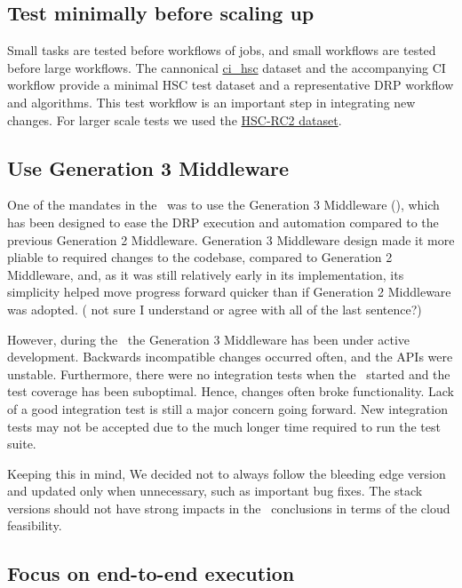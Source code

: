 \subsection{Test minimally before scaling up}

Small tasks are tested before workflows of jobs, and small workflows are tested before large workflows.
The cannonical \href{https://github.com/lsst/ci\_hsc}{ci\_hsc} dataset and the accompanying CI workflow provide a minimal HSC test dataset and a representative DRP workflow and algorithms.
This test workflow is an important step in integrating new changes.
For larger scale tests we used the \href{https://jira.lsstcorp.org/browse/DM-11345}{HSC-RC2 dataset}.

\subsection{Use Generation 3 Middleware}

One of the mandates in the \poc~was to use the Generation 3 Middleware (), which has been designed to ease the DRP execution and automation compared to the previous Generation 2 Middleware. Generation 3 Middleware design made it more pliable to required changes to the codebase, compared to Generation 2 Middleware, and, as it was still relatively early in its implementation, its simplicity helped move progress forward quicker than if Generation 2 Middleware was adopted.
({\color{red} not sure I understand or agree with all of the last sentence?})


However, during the \poc~the Generation 3 Middleware has been under active development. Backwards incompatible changes occurred often, and the APIs were unstable. Furthermore, there were no integration tests when the \poc~started and the test coverage has been suboptimal.
Hence, changes often broke functionality.
Lack of a good integration test is still a major concern going forward.
New integration tests may not be accepted due to the much longer time required to run the test suite.

Keeping this in mind, We decided not to always follow the bleeding edge version and updated only when unnecessary, such as important bug fixes. The stack versions should not have strong impacts in the \poc~conclusions in terms of the cloud feasibility.

\subsection{Focus on end-to-end execution}

